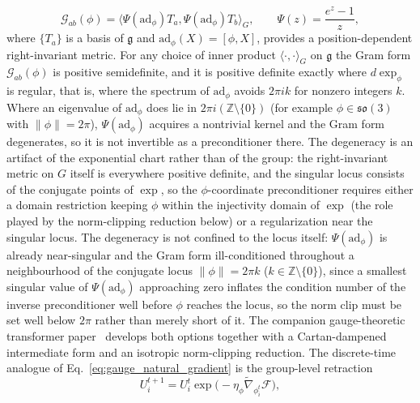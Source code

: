 \documentclass[11pt]{article}
\begin{document}
\begin{equation}
\mathcal{G}_{ab}(\phi) = \langle \Psi(\mathrm{ad}_\phi)T_a, \Psi(\mathrm{ad}_\phi)T_b \rangle_G,
\qquad
\Psi(z) = \frac{e^z - 1}{z},
\label{eq:pullback_metric}
\end{equation}
where $\{T_a\}$ is a basis of $\mathfrak{g}$ and $\mathrm{ad}_\phi(X) = [\phi, X]$, provides a position-dependent right-invariant metric. For any choice of inner product $\langle\cdot,\cdot\rangle_G$ on $\mathfrak{g}$ the Gram form $\mathcal{G}_{ab}(\phi)$ is positive semidefinite, and it is positive definite exactly where $d\exp_\phi$ is regular, that is, where the spectrum of $\mathrm{ad}_\phi$ avoids $2\pi i k$ for nonzero integers $k$. Where an eigenvalue of $\mathrm{ad}_\phi$ does lie in $2\pi i(\mathbb{Z}\setminus\{0\})$ (for example $\phi \in \mathfrak{so}(3)$ with $\|\phi\| = 2\pi$), $\Psi(\mathrm{ad}_\phi)$ acquires a nontrivial kernel and the Gram form degenerates, so it is not invertible as a preconditioner there. The degeneracy is an artifact of the exponential chart rather than of the group: the right-invariant metric on $G$ itself is everywhere positive definite, and the singular locus consists of the conjugate points of $\exp$, so the $\phi$-coordinate preconditioner requires either a domain restriction keeping $\phi$ within the injectivity domain of $\exp$ (the role played by the norm-clipping reduction below) or a regularization near the singular locus. The degeneracy is not confined to the locus itself: $\Psi(\mathrm{ad}_\phi)$ is already near-singular and the Gram form ill-conditioned throughout a neighbourhood of the conjugate locus $\|\phi\| = 2\pi k$ ($k \in \mathbb{Z}\setminus\{0\}$), since a smallest singular value of $\Psi(\mathrm{ad}_\phi)$ approaching zero inflates the condition number of the inverse preconditioner well before $\phi$ reaches the locus, so the norm clip must be set well below $2\pi$ rather than merely short of it. The companion gauge-theoretic transformer paper~\cite{Dennis2025trans} develops both options together with a Cartan-dampened intermediate form and an isotropic norm-clipping reduction. The discrete-time analogue of Eq.~\eqref{eq:gauge_natural_gradient} is the group-level retraction
\begin{equation}
U_i^{t+1} = U_i^t \exp\big(-\eta_\phi \tilde{\nabla}_{\phi_i^t} \mathcal{F}\big),
\label{eq:gauge_group_retraction}
\end{equation}
\end{document}
